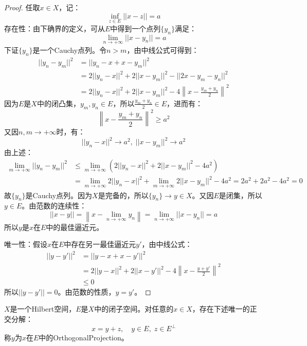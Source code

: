 \begin{proof}
	任取$x\in X$，记：
	\begin{equation*}
		\inf_{z\in E}||x-z||=a
	\end{equation*}
	\hspace{2em}存在性：由下确界的定义，可从$E$中得到一个点列$\{y_n\}$满足：
	\begin{equation*}
		\lim_{n\to+\infty}||x-y_n||=a
	\end{equation*}
	下证$\{y_n\}$是一个Cauchy点列。令$n>m$，由中线公式可得到：
	\begin{align*}
		||y_n-y_m||^2
		&=||y_n-x+x-y_m||^2 \\
		&=2||y_n-x||^2+2||x-y_m||^2-||2x-y_m-y_n||^2 \\
		&=2||y_n-x||^2+2||x-y_m||^2-4\left\|x-\frac{y_m+y_n}{2}\right\|^2
	\end{align*}
	因为$E$是$X$中的闭凸集，$y_m,y_n\in E$，所以$\frac{y_m+y_n}{2}\in E$，进而有：
	\begin{equation*}
		\left\|x-\frac{y_m+y_n}{2}\right\|^2\geqslant a^2
	\end{equation*}
	又因$n,m\to+\infty$时，有：
	\begin{equation*}
		||y_n-x||^2\to a^2,\;||x-y_m||^2\to a^2
	\end{equation*}
	由上述：
	\begin{align*}
		\lim_{m\to+\infty}||y_n-y_m||^2
		&\leqslant\lim_{m\to+\infty}\left(2||y_n-x||^2+2||x-y_m||^2-4a^2\right) \\
		&=\lim_{m\to+\infty}2||y_n-x||^2+\lim_{m\to+\infty}2||x-y_m||^2-4a^2=2a^2+2a^2-4a^2=0
	\end{align*}
	故$\{y_n\}$是Cauchy点列。因为$X$是完备的，所以$\{y_n\}\to y\in X$。又因$E$是闭集，所以$y\in E$。由范数的连续性：
	\begin{equation*}
		||x-y||=\left\|x-\lim_{n\to+\infty}y_n\right\|=\lim_{n\to+\infty}||x-y_n||=a
	\end{equation*}
	所以$y$是$x$在$E$中的最佳逼近元。\par
	唯一性：假设$x$在$E$中存在另一最佳逼近元$y'$，由中线公式：
	\begin{align*}
		||y-y'||^2
		&=||y-x+x-y'||^2 \\
		&=2||y-x||^2+2||x-y'||^2-4\left\|x-\frac{y+y'}{2}\right\|^2 \\
		&\leqslant0
	\end{align*}
	所以$||y-y'||=0$。由范数的性质，$y=y'$。
\end{proof}
\begin{theorem}
	$X$是一个Hilbert空间，$E$是$X$中的闭子空间。对任意的$x\in X$，存在下述唯一的正交分解：
	\begin{equation*}
		x=y+z,\quad y\in E,\;z\in E^{\perp}
	\end{equation*}
	称$y$为$x$在$E$中的\gls{OrthogonalProjection}。
\end{theorem}
